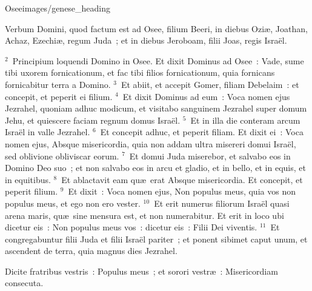 {Osee}{images/genese_heading}


\lettrine[lines=6,image=true,loversize=0.05,lraise=-0.03]{V}{}erbum Domini, quod factum est ad Osee, filium Beeri, in diebus Ozi\ae , Joathan, Achaz, Ezechi\ae , regum Juda~; et in diebus Jeroboam, filii Joas, regis Isra\"el.


${}^{2}$~Principium loquendi Domino in Osee. Et dixit Dominus ad Osee~: Vade, sume tibi uxorem fornicationum, et fac tibi filios fornicationum, quia fornicans fornicabitur terra a Domino.
${}^{3}$~Et abiit, et accepit Gomer, filiam Debelaim~: et concepit, et peperit ei filium.
${}^{4}$~Et dixit Dominus ad eum~: Voca nomen ejus Jezrahel, quoniam adhuc modicum, et visitabo sanguinem Jezrahel super domum Jehu, et quiescere faciam regnum domus Isra\"el.
${}^{5}$~Et in illa die conteram arcum Isra\"el in valle Jezrahel.
${}^{6}$~Et concepit adhuc, et peperit filiam. Et dixit ei~: Voca nomen ejus, Absque misericordia, quia non addam ultra misereri domui Isra\"el, sed oblivione obliviscar eorum.
${}^{7}$~Et domui Juda miserebor, et salvabo eos in Domino Deo suo~; et non salvabo eos in arcu et gladio, et in bello, et in equis, et in equitibus.
${}^{8}$~Et ablactavit eam qu\ae\ erat Absque misericordia. Et concepit, et peperit filium.
${}^{9}$~Et dixit~: Voca nomen ejus, Non populus meus, quia vos non populus meus, et ego non ero vester.
${}^{10}$~Et erit numerus filiorum Isra\"el quasi arena maris, qu\ae\ sine mensura est, et non numerabitur. Et erit in loco ubi dicetur eis~: Non populus meus vos~: dicetur eis~: Filii Dei viventis.
${}^{11}$~Et congregabuntur filii Juda et filii Isra\"el pariter~; et ponent sibimet caput unum, et ascendent de terra, quia magnus dies Jezrahel.

\lettrine[lines=3,image=true,loversize=0.05,lraise=-0.03]{D}{}icite fratribus vestris~: Populus meus~; et sorori vestr\ae~: Misericordiam consecuta.


